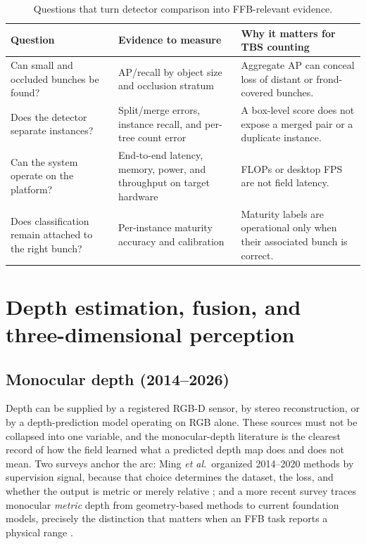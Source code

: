 \begin{table}[t]
\centering\small
\caption{Questions that turn detector comparison into FFB-relevant evidence.}
\label{tab:baseline}
\begin{tabular}{p{}p{}p{}}
\toprule
Question & Evidence to measure & Why it matters for TBS counting \\
\midrule
Can small and occluded bunches be found? & AP/recall by object size and occlusion stratum & Aggregate AP can conceal loss of distant or frond-covered bunches. \\
Does the detector separate instances? & Split/merge errors, instance recall, and per-tree count error & A box-level score does not expose a merged pair or a duplicate instance. \\
Can the system operate on the platform? & End-to-end latency, memory, power, and throughput on target hardware & FLOPs or desktop FPS are not field latency. \\
Does classification remain attached to the right bunch? & Per-instance maturity accuracy and calibration & Maturity labels are operational only when their associated bunch is correct. \\
\bottomrule
\end{tabular}
\end{table}

\section{Depth estimation, fusion, and three-dimensional perception}

\subsection{Monocular depth (2014--2026)}

Depth can be supplied by a registered RGB-D sensor, by stereo reconstruction, or by a depth-prediction model operating on RGB alone. These sources must not be collapsed into one variable, and the monocular-depth literature is the clearest record of how the field learned what a predicted depth map does and does not mean. Two surveys anchor the arc: Ming \textit{et al.}\ organized 2014--2020 methods by supervision signal, because that choice determines the dataset, the loss, and whether the output is metric or merely relative \cite{ming2021depthsurvey}; and a more recent survey traces monocular \emph{metric} depth from geometry-based methods to current foundation models, precisely the distinction that matters when an FFB task reports a physical range \cite{zhang2025metricdepthsurvey}.

